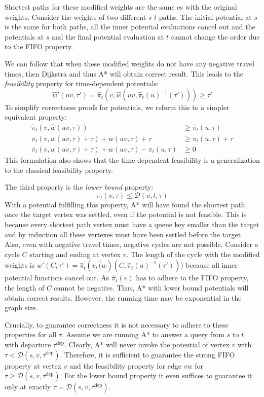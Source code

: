 \documentclass[a4paper,UKenglish,cleveref, autoref, thm-restate,anonymous]{lipics-v2021}
\newcommand*{\dist}{\mathcal{D}}
\newcommand*{\tdep}{\tau^{\operatorname{dep}}}
\begin{document}
Shortest paths for these modified weights are the same es with the original weights.
Consider the weights of two different $s$-$t$ paths.
The initial potential at $s$ is the same for both paths, all the inner potential evaluations cancel out and the potentials at $s$ and the final potential evaluation at $t$ cannot change the order due to the FIFO property.

We can follow that when these modified weights do not have any negative travel times, then Dijkstra and thus A* will obtain correct result. %
This leads to the \emph{feasibility} property for time-dependent potentials:
\[
\hat{w}'(uv, \tau') = \hat{\pi}_t(v, \hat{w}(uv, \hat{\pi}_t(u)^{-1}(\tau'))) \geq \tau'
\]
To simplify correctness proofs for potentials, we reform this to a simpler equivalent property:
\begin{align*}
\hat{\pi}_t(v, \hat{w}(uv, \tau)) & \geq \hat{\pi}_t(u, \tau) \\
\pi_t(v, w(uv, \tau) + \tau) + w(uv, \tau) + \tau & \geq \pi_t(u, \tau) + \tau \\
\pi_t(v, w(uv, \tau) + \tau) + w(uv, \tau) - \pi_t(u, \tau) & \geq 0
\end{align*}
This formulation also shows that the time-dependent feasibility is a generalization to the classical feasibility property.

The third property is the \emph{lower bound} property:
\[
\pi_t(v, \tau) \leq \dist(v,t,\tau)
\]
With a potential fulfilling this property, A* will have found the shortest path once the target vertex was settled, even if the potential is not feasible.
This is because every shortest path vertex must have a queue key smaller than the target and by induction all these vertexes must have been settled before the target.
Also, even with negative travel times, negative cycles are not possible.
Consider a cycle $C$ starting and ending at vertex $v$.
The length of the cycle with the modified weights is $w'(C, \tau') = \hat{\pi}_t(v, \hat(w)(C, \hat{\pi}_t(u)^{-1}(\tau')))$ because all inner potential functions cancel out.
As $\hat{\pi}_t(v)$ has to adhere to the FIFO property, the length of $C$ cannot be negative.
Thus, A* with lower bound potentials will obtain correct results.
However, the running time may be exponential in the graph size.

Crucially, to guarantee correctness it is not necessary to adhere to these properties for all $\tau$.
Assume we are running A* to answer a query from $s$ to $t$ with departure $\tdep$.
Clearly, A* will never invoke the potential of vertex $v$ with $\tau < \dist(s,v,\tdep)$.
Therefore, it is sufficient to guarantee the strong FIFO property at vertex $v$ and the feasibility property for edge $vw$ for $\tau \geq \dist(s,v,\tdep)$.
For the lower bound property it even suffices to guarantee it only at exactly $\tau = \dist(s,v,\tdep)$.
\end{document}
